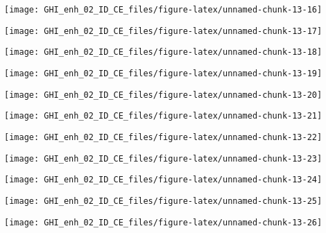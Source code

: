 \documentclass[
  10pt,
  a4paper,oneside]{article}
\begin{document}
\begin{center}\texttt{[image: GHI\_enh\_02\_ID\_CE\_files/figure-latex/unnamed-chunk-13-16]} \end{center}

\begin{center}\texttt{[image: GHI\_enh\_02\_ID\_CE\_files/figure-latex/unnamed-chunk-13-17]} \end{center}

\begin{center}\texttt{[image: GHI\_enh\_02\_ID\_CE\_files/figure-latex/unnamed-chunk-13-18]} \end{center}

\begin{center}\texttt{[image: GHI\_enh\_02\_ID\_CE\_files/figure-latex/unnamed-chunk-13-19]} \end{center}

\begin{center}\texttt{[image: GHI\_enh\_02\_ID\_CE\_files/figure-latex/unnamed-chunk-13-20]} \end{center}

\begin{center}\texttt{[image: GHI\_enh\_02\_ID\_CE\_files/figure-latex/unnamed-chunk-13-21]} \end{center}

\begin{center}\texttt{[image: GHI\_enh\_02\_ID\_CE\_files/figure-latex/unnamed-chunk-13-22]} \end{center}

\begin{center}\texttt{[image: GHI\_enh\_02\_ID\_CE\_files/figure-latex/unnamed-chunk-13-23]} \end{center}

\begin{center}\texttt{[image: GHI\_enh\_02\_ID\_CE\_files/figure-latex/unnamed-chunk-13-24]} \end{center}

\begin{center}\texttt{[image: GHI\_enh\_02\_ID\_CE\_files/figure-latex/unnamed-chunk-13-25]} \end{center}

\begin{center}\texttt{[image: GHI\_enh\_02\_ID\_CE\_files/figure-latex/unnamed-chunk-13-26]} \end{center}
\end{document}
